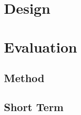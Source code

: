 \documentclass{ituthesis}
\begin{document}




\chapter{Design}
\label{ch:design}


\chapter{Evaluation}
\label{ch:evaluation}

	\section{Method}
	\label{sec:evaluation_method}

	\section{Short Term}
	\label{sec:evaluation_short}
\end{document}
